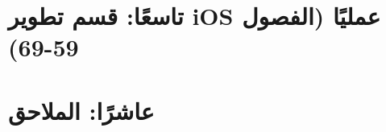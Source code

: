\documentclass[11pt,a4paper,openany]{book}
\begin{document}
\part*{تاسعًا: قسم تطوير iOS عمليًا (الفصول 59-69)}











\appendix
\part*{عاشرًا: الملاحق}









\end{document}
